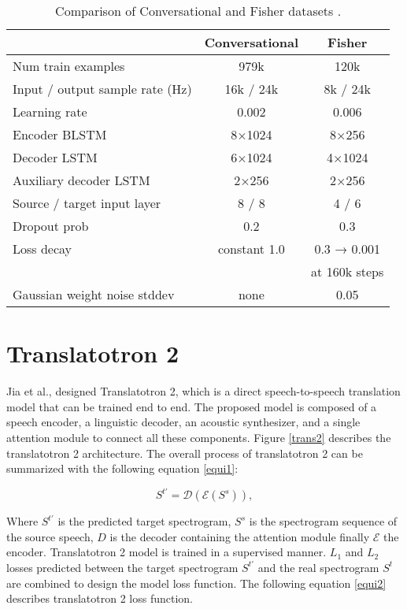\documentclass[12pt]{article}
\begin{document}
\begin{table}[h!]
\renewcommand{\arraystretch}{1} 
\centering
\caption{Comparison of Conversational and Fisher datasets \cite{jia}.}
\vspace{10pt}
\begin{tabular}{l c c }
\hline
 & \textbf{Conversational} & \textbf{Fisher} \\ 
\hline
Num train examples & 979k & 120k \\
Input / output sample rate (Hz) & 16k / 24k & 8k / 24k \\
Learning rate & 0.002 & 0.006 \\
Encoder BLSTM & 8×1024 & 8×256 \\ 
Decoder LSTM & 6×1024 & 4×1024 \\ 
Auxiliary decoder LSTM & 2×256 & 2×256 \\ 
Source / target input layer & 8 / 8 & 4 / 6 \\
Dropout prob & 0.2 & 0.3 \\ 
Loss decay & constant 1.0 & 0.3 → 0.001 \\ 
 &  & at 160k steps \\ 
Gaussian weight noise stddev & none & 0.05 \\ \hline
\end{tabular}

\label{tab1}
\end{table}



\section{Translatotron 2}
 Jia et al.,\cite{jia2} designed Translatotron 2, which is a direct speech-to-speech translation model that can be trained end to end. The proposed model is composed of a speech encoder,  a linguistic decoder, an acoustic synthesizer, and a single attention module to connect all these components. Figure \ref{trans2} describes the translatotron 2 architecture.
The overall process of translatotron 2 can be summarized with the following equation  \ref{equi1}:

\begin{equation}
S^{t'} = \mathcal{D} \left( \mathcal{E} \left( S^s \right) \right),
\label{equi1}
\end{equation}

Where $S^{t'}$ is the predicted target spectrogram,  $S^{s}$ is the spectrogram sequence of the source speech, $D$ is the decoder containing the attention module finally $\mathcal{E} $ the encoder. Translatotron 2 model is trained in a supervised manner. $L_{1}$ and $L_{2}$ losses predicted between the target spectrogram $S^{t'}$ and the real spectrogram $S^{t}$ are combined to design the model loss function. The following equation \ref{equi2} describes translatotron 2 loss function.
\end{document}
